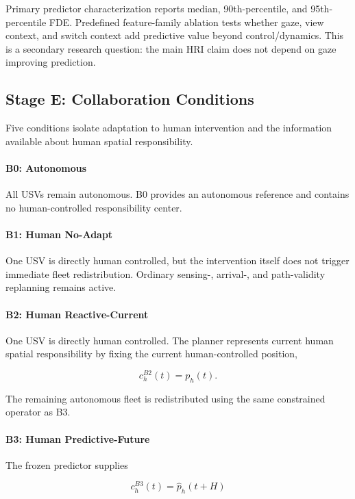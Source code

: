 \documentclass[conference]{IEEEtran}
\begin{document}
Primary predictor characterization reports median, 90th-percentile, and
95th-percentile FDE. Predefined feature-family ablation tests whether gaze,
view context, and switch context add predictive value beyond control/dynamics.
This is a secondary research question: the main HRI claim does not depend on
gaze improving prediction.

\subsection{Stage E: Collaboration Conditions}

Five conditions isolate adaptation to human intervention and the information
available about human spatial responsibility.

\paragraph{B0: Autonomous}
All USVs remain autonomous. B0 provides an autonomous reference and contains no
human-controlled responsibility center.

\paragraph{B1: Human No-Adapt}
One USV is directly human controlled, but the intervention itself does not
trigger immediate fleet redistribution. Ordinary sensing-, arrival-, and
path-validity replanning remains active.

\paragraph{B2: Human Reactive-Current}
One USV is directly human controlled. The planner represents current human
spatial responsibility by fixing the current human-controlled position,

\begin{equation}
c_h^{B2}(t)=p_h(t).
\label{eq:b2_stagee}
\end{equation}

The remaining autonomous fleet is redistributed using the same constrained
operator as B3.

\paragraph{B3: Human Predictive-Future}
The frozen predictor supplies

\begin{equation}
c_h^{B3}(t)=\hat p_h(t+H)
\label{eq:b3_stagee}
\end{equation}
\end{document}

